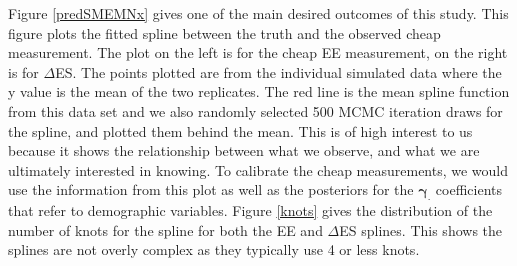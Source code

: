 \documentclass[11pt]{article}\usepackage[]{graphicx}\usepackage[]{color}
\begin{document}
Figure \ref{predSMEMNx} gives one of the main desired outcomes of this study. This figure plots the fitted spline between the truth and the observed cheap measurement. The plot on the left is for the cheap EE measurement, on the right is for $\Delta$ES. The points plotted are from the individual simulated data where the y value is the mean of the two replicates. The red line is the mean spline function from this data set and we also randomly selected 500 MCMC iteration draws for the spline, and plotted them behind the mean. This is of high interest to us because it shows the relationship between what we observe, and what we are ultimately interested in knowing. To calibrate the cheap measurements, we would use the information from this plot as well as the posteriors for the $\boldsymbol{\gamma_{\cdot}}$ coefficients that refer to demographic variables. Figure \ref{knots} gives the distribution of the number of knots for the spline for both the EE and $\Delta$ES splines. This shows the splines are not overly complex as they typically use 4 or less knots.


\end{document}
